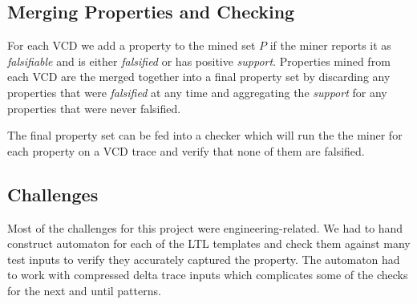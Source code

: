 \documentclass[acmlarge,11pt,nonacm]{acmart}
\begin{document}
\subsection{Merging Properties and Checking}
For each VCD we add a property to the mined set $P$ if the miner reports it as \textit{falsifiable} and is either \textit{falsified} or has positive \textit{support}.
Properties mined from each VCD are the merged together into a final property set by discarding any properties that were \textit{falsified} at any time and aggregating the \textit{support} for any properties that were never falsified.

The final property set can be fed into a checker which will run the the miner for each property on a VCD trace and verify that none of them are falsified.

\subsection{Challenges}
Most of the challenges for this project were engineering-related.
We had to hand construct automaton for each of the LTL templates and check them against many test inputs to verify they accurately captured the property.
The automaton had to work with compressed delta trace inputs which complicates some of the checks for the next and until patterns.
\end{document}
